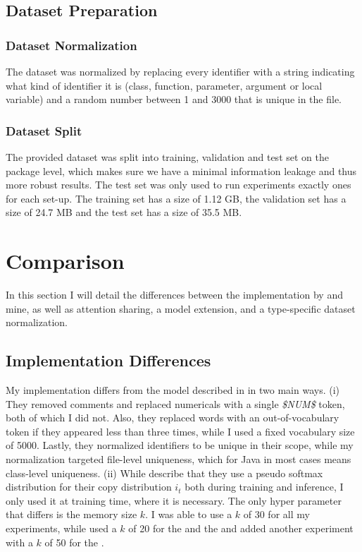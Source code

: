 \documentclass[11pt]{article}
\begin{document}
\subsection{Dataset Preparation}
\subsubsection{Dataset Normalization}
\label{normalization}
The dataset was normalized by replacing every identifier with a string indicating what kind of identifier it is (class, function, parameter, argument or local variable) and a random number between 1 and 3000 that is unique in the file.
\subsubsection{Dataset Split}
The provided dataset was split into training, validation and test set on the package level, which makes sure we have a minimal information leakage and thus more robust results. The test set was only used to run experiments exactly ones for each set-up. The training set has a size of 1.12 GB, the validation set has a size of 24.7 MB and the test set has a size of 35.5 MB.

\section{Comparison}
In this section I will detail the differences between the implementation by \cite{bhoopchand2016learning} and mine, as well as attention sharing, a model extension, and a type-specific dataset normalization.
\subsection{Implementation Differences}
My implementation differs from the model described in \cite{bhoopchand2016learning} in two main ways. (i) They removed comments and replaced numericals with a single 	\textit{\$NUM\$} token, both of which I did not. Also, they replaced words with an out-of-vocabulary token if they appeared less than three times, while I used a fixed vocabulary size of 5000. Lastly, they normalized identifiers to be unique in their scope, while my normalization targeted file-level uniqueness, which for Java in most cases means class-level uniqueness. (ii) While \cite{bhoopchand2016learning} describe that they use a pseudo softmax distribution for their copy distribution $i_t$ both during training and inference, I only used it at training time, where it is necessary.
The only hyper parameter that differs is the memory size $k$. I was able to use a $k$ of 30 for all my experiments, while \cite{bhoopchand2016learning} used a $k$ of 20 for the \spn and the \lmatt and added another experiment with a $k$ of 50 for the \lmatt.
\end{document}
